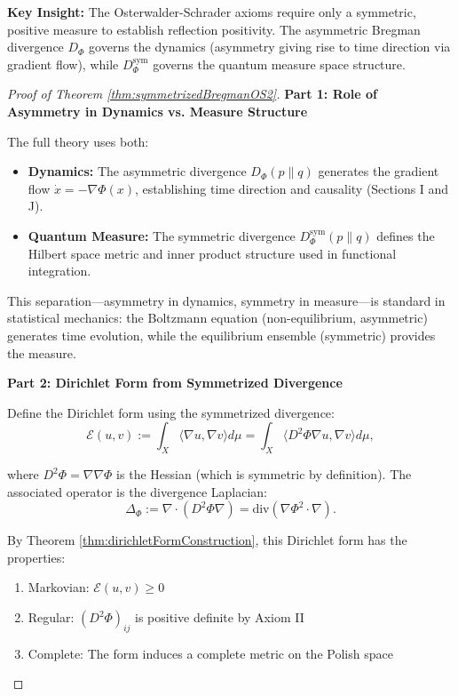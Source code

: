 \begin{lemma}
\begin{theorem}
\begin{definition}
\end{definition}

\textbf{Key Insight:} The Osterwalder-Schrader axioms require only a symmetric, positive measure to establish reflection positivity. The asymmetric Bregman divergence $D_\Phi$ governs the dynamics (asymmetry giving rise to time direction via gradient flow), while $D_\Phi^{\mathrm{sym}}$ governs the quantum measure space structure.

\begin{proof}[Proof of Theorem \ref{thm:symmetrizedBregmanOS2}]

\textbf{Part 1: Role of Asymmetry in Dynamics vs. Measure Structure}

The full theory uses both:
\begin{itemize}
\item \textbf{Dynamics:} The asymmetric divergence $D_\Phi(p \| q)$ generates the gradient flow $\dot{x} = -\nabla\Phi(x)$, establishing time direction and causality (Sections I and J).
\item \textbf{Quantum Measure:} The symmetric divergence $D_\Phi^{\mathrm{sym}}(p \| q)$ defines the Hilbert space metric and inner product structure used in functional integration.
\end{itemize}

This separation---asymmetry in dynamics, symmetry in measure---is standard in statistical mechanics: the Boltzmann equation (non-equilibrium, asymmetric) generates time evolution, while the equilibrium ensemble (symmetric) provides the measure.

\textbf{Part 2: Dirichlet Form from Symmetrized Divergence}

Define the Dirichlet form using the symmetrized divergence:
\begin{equation}
\mathcal{E}(u, v) := \int_X \langle \nabla u, \nabla v \rangle d\mu = \int_X \langle D^2\Phi \nabla u, \nabla v \rangle d\mu,
\end{equation}

where $D^2\Phi = \nabla\nabla\Phi$ is the Hessian (which is symmetric by definition). The associated operator is the divergence Laplacian:
\begin{equation}
\Delta_{\Phi} := \nabla \cdot (D^2\Phi \nabla) = \text{div}(\nabla\Phi^2 \cdot \nabla).
\end{equation}

By Theorem \ref{thm:dirichletFormConstruction}, this Dirichlet form has the properties:
\begin{enumerate}
\item Markovian: $\mathcal{E}(u, v) \geq 0$
\item Regular: $(D^2\Phi)_{ij}$ is positive definite by Axiom II
\item Complete: The form induces a complete metric on the Polish space
\end{enumerate}


\end{proof}
\end{theorem}
\end{lemma}
